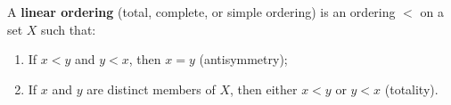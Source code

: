 A \textbf{linear ordering} (total, complete, or simple ordering) is an ordering $<$ on a set $X$ such that:
\begin{enumerate}
\item[(a)] If $x < y$ and $y < x$, then $x = y$ (antisymmetry);
\item[(b)] If $x$ and $y$ are distinct members of $X$, then either $x < y$ or $y < x$ (totality).
\end{enumerate}
